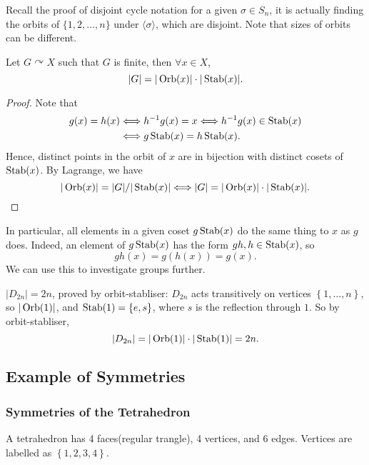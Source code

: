 \documentclass[a4paper]{article}
\newcommand{\bluecomment}[1]{{\color{blue}#1}}
\begin{document}
\begin{remark}
  Recall the proof of disjoint cycle notation for a given $ \sigma\in
  S_n $, it is actually finding the orbits of $ \{1,2,\dots,n\} $
  under $ \langle \sigma \rangle  $, which are disjoint.
  \bluecomment{Note that sizes of orbits can be different.}
\end{remark}
\newpage
\begin{theorem}\label{thm:Orbit-Stabliser Theorem}
  Let $ G \curvearrowright X $ such that $G$ is finite, then $ \forall x\in X $,
  \[
    |G|=|\operatorname{Orb}(x)|\cdot |\operatorname{Stab}(x)|
  .\]
\end{theorem}
\begin{proof}
  Note that
  \[
    \begin{aligned}
      g(x)=h(x)&\Longleftrightarrow h^{-1}g(x)=x \Longleftrightarrow
      h^{-1}g(x)\in \operatorname{Stab}(x)\\
      &\Longleftrightarrow g\operatorname{Stab}(x)=h\operatorname{Stab}(x).
    \end{aligned}
  \]
  Hence, distinct points in the orbit of $x$ are in bijection with
  distinct cosets of $\operatorname{Stab}(x)$. By Lagrange, we have
  \[
    |\operatorname{Orb}(x)|=|G|/|\operatorname{Stab}(x)| \Longleftrightarrow |G|=|\operatorname{Orb}(x)|\cdot |\operatorname{Stab}(x)|
  .\]
\end{proof}
In particular, all elements in a given coset $ g\operatorname{Stab}(x) $ do the
same thing to $x$ as $g$ does. Indeed, an element of $g\operatorname{Stab}(x)$ has
the form $ gh,h\in \operatorname{Stab}(x) $, so
\[
  gh(x)=g(h(x))=g(x)
.\]
We can use this to investigate groups further.
\begin{example}
  $ |D_{2n}|=2n $, proved by orbit-stabliser: $ D_{2n} $ acts
  transitively on vertices $ \left\{ 1,\dots,n\right\} $, so $
  |\operatorname{Orb}(1)| $, and $ \operatorname{Stab}(1)=\left\{ e,s\right\} $, where $s$ is the
  reflection through $1$. So by orbit-stabliser,
  \[
    |D_{2n}|=|\operatorname{Orb}(1)|\cdot |\operatorname{Stab}(1)|=2n
  .\]
\end{example}
\subsection{Example of Symmetries}
\subsubsection{Symmetries of the Tetrahedron}
A tetrahedron has 4 faces(regular trangle), 4 vertices, and 6 edges.
Vertices are labelled as $ \left\{ 1,2,3,4 \right\} $.
\end{document}
